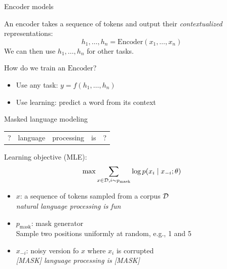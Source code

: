 \documentclass[usenames,dvipsnames,notes,11pt,aspectratio=169,hyperref={colorlinks=true, linkcolor=blue}]{beamer}
\begin{document}
\begin{frame}
    {Encoder models}
    
    An encoder takes a sequence of tokens and output their {\em contextualized} representations:
    $$
        h_1,\ldots,h_n = \mathrm{Encoder}(x_1,\ldots,x_n)
    $$
    We can then use $h_1,\ldots,h_n$ for other tasks.

    \pause\bigskip
    How do we train an $\mathrm{Encoder}$?\\
    \begin{itemize}
        \item Use any  task: $y=f(h_1,\ldots,h_n)$
        \item Use  learning: predict a word from its context 
    \end{itemize}
\end{frame}

\begin{frame}
    {Masked language modeling}

    \begin{tabular}{ccccc}
        ? & language & processing & is & ?
    \end{tabular}

    \pause\medskip
    Learning objective (MLE):\\
    $$
    \max \sum_{x\in\mathcal{D}, i\sim p_{\text{mask}}} \log p(x_i\mid x_{-i}; \theta)
    $$
    \vspace{-1em}
    \begin{itemize}
        \item $x$: a sequence of tokens sampled from a corpus $\mathcal{D}$\\
            {\em natural language processing is fun}
        \item $p_{\text{mask}}$: mask generator\\
            Sample two positions uniformly at random, e.g., 1 and 5
        \item $x_{-i}$: noisy version fo $x$ where $x_i$ is corrupted\\
            {\em [MASK] language processing is [MASK]}
    \end{itemize}
\end{frame}
\end{document}
